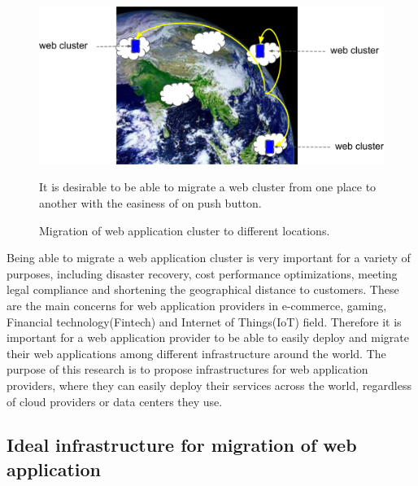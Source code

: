 \begin{figure}[h]
\begin{center}
\includegraphics[width=0.7\columnwidth]{Figs/earth}
\end{center}
\caption{
Migration of web application cluster to different locations.
}
\centering\parbox[c]{0.9\columnwidth}{
It is desirable to be able to migrate a web cluster from one place to another with the easiness of on push button.
}
\label{fig:earth}
\end{figure}

Being able to migrate a web application cluster is very important for a variety of purposes, including disaster recovery, cost performance optimizations, meeting legal compliance and shortening the geographical distance to customers.
These are the main concerns for web application providers in e-commerce, gaming, Financial technology(Fintech) and Internet of Things(IoT) field.
Therefore it is important for a web application provider to be able to easily deploy and migrate their web applications among different infrastructure around the world.
The purpose of this research is to propose infrastructures for web application providers, where they can easily deploy their services across the world, regardless of cloud providers or data centers they use.


\subsection{Ideal infrastructure for migration of web application}

